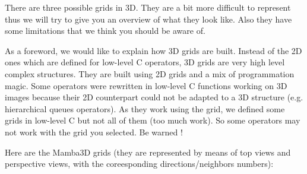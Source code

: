 \documentclass[a4paper,10pt,oneside]{article}
\begin{document}
There are three possible grids in 3D. They are a bit more
difficult to represent thus we will try to give you an overview
of what they look like. Also they have some limitations that we think you
should be aware of.

As a foreword, we would like to explain how 3D grids are built.
Instead of the 2D ones which are defined for low-level C operators, 3D
grids are very high level complex structures. They are built using 2D grids and
a mix of programmation magic. Some operators were rewritten in low-level C
functions working on 3D images because their 2D counterpart could not be adapted
to a 3D structure (e.g. hierarchical queues operators). As they work using the
grid, we defined some grids in low-level C but not all of them (too much work).
So some operators may not work with the grid you selected. Be warned !


Here are the Mamba3D grids (they are represented by means of top views and perspective views,
with the coreesponding directions/neighbors numbers):
\end{document}
